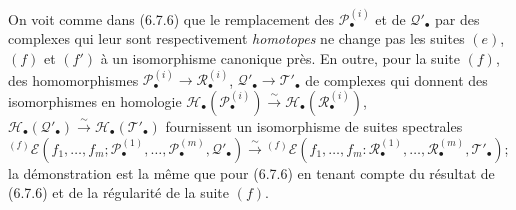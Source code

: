 \begin{remark}[6.9.5]
On voit comme dans (6.7.6) que le remplacement des
$\mathscr P_\bullet^{(i)}$ et de $\mathscr Q'_\bullet$ par des complexes qui
leur sont respectivement \emph{homotopes} ne change pas les suites $(e)$, $(f)$ et
$(f')$ à un isomorphisme canonique près. En outre, pour la suite $(f)$, des
homomorphismes
$\mathscr P_\bullet^{(i)}\to\mathscr R_\bullet^{(i)}$,
$\mathscr Q'_\bullet\to\mathscr T'_\bullet$ de complexes qui donnent des
isomorphismes en homologie
$\mathscr H_\bullet(\mathscr P_\bullet^{(i)})\xrightarrow{\sim}
\mathscr H_\bullet(\mathscr R_\bullet^{(i)})$,
$\mathscr H_\bullet(\mathscr Q'_\bullet)\xrightarrow{\sim}
\mathscr H_\bullet(\mathscr T'_\bullet)$ fournissent un isomorphisme de suites
spectrales
${}^{(f)}\mathscr E
(f_1,\ldots,f_m;
\mathscr P_\bullet^{(1)},\ldots,\mathscr P_\bullet^{(m)},
\mathscr Q'_\bullet)
\xrightarrow{\sim}
{}^{(f)}\mathscr E
(f_1,\ldots,f_m:
\mathscr R_\bullet^{(1)},\ldots,\mathscr R_\bullet^{(m)},
\mathscr T'_\bullet)$;
la démonstration est la même que pour (6.7.6) en tenant compte du résultat
de (6.7.6) et de la régularité de la suite $(f)$.
\end{remark}

